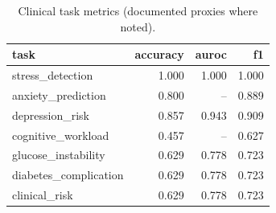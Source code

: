 \begin{table}[t]
\centering
\caption{Clinical task metrics (documented proxies where noted).}
\label{tab:clinical}
\begin{tabular}{lrrr}
\toprule
task & accuracy & auroc & f1 \\
\midrule
stress\_detection & 1.000 & 1.000 & 1.000 \\
anxiety\_prediction & 0.800 & -- & 0.889 \\
depression\_risk & 0.857 & 0.943 & 0.909 \\
cognitive\_workload & 0.457 & -- & 0.627 \\
glucose\_instability & 0.629 & 0.778 & 0.723 \\
diabetes\_complication & 0.629 & 0.778 & 0.723 \\
clinical\_risk & 0.629 & 0.778 & 0.723 \\
\bottomrule
\end{tabular}
\end{table}

